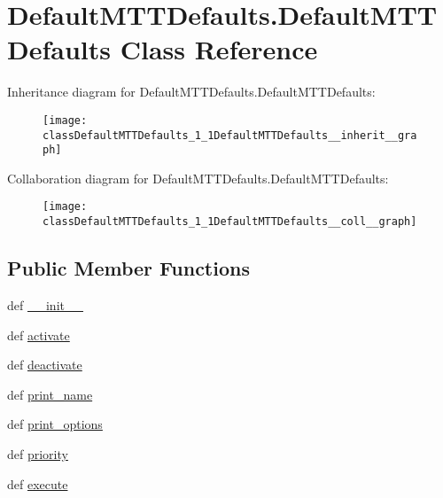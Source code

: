 \hypertarget{classDefaultMTTDefaults_1_1DefaultMTTDefaults}{\section{Default\-M\-T\-T\-Defaults.\-Default\-M\-T\-T\-Defaults Class Reference}
\label{classDefaultMTTDefaults_1_1DefaultMTTDefaults}
}


Inheritance diagram for Default\-M\-T\-T\-Defaults.\-Default\-M\-T\-T\-Defaults\-:\nopagebreak
\begin{figure}[H]
\begin{center}
\leavevmode
\texttt{[image: classDefaultMTTDefaults\_1\_1DefaultMTTDefaults\_\_inherit\_\_graph]}
\end{center}
\end{figure}


Collaboration diagram for Default\-M\-T\-T\-Defaults.\-Default\-M\-T\-T\-Defaults\-:\nopagebreak
\begin{figure}[H]
\begin{center}
\leavevmode
\texttt{[image: classDefaultMTTDefaults\_1\_1DefaultMTTDefaults\_\_coll\_\_graph]}
\end{center}
\end{figure}
\subsection*{Public Member Functions}
\begin{DoxyCompactItemize}
\item 
def \hyperlink{classDefaultMTTDefaults_1_1DefaultMTTDefaults_af45ae89ffdda25b5db56cc32d6f38617}{\-\_\-\-\_\-init\-\_\-\-\_\-}
\item 
def \hyperlink{classDefaultMTTDefaults_1_1DefaultMTTDefaults_ab168e4b76bd07ff868f6d8c8dcfbabcd}{activate}
\item 
def \hyperlink{classDefaultMTTDefaults_1_1DefaultMTTDefaults_abbdeb62905e733e0145243e238991e1b}{deactivate}
\item 
def \hyperlink{classDefaultMTTDefaults_1_1DefaultMTTDefaults_a39fc17ab14b57f8aeaa7df1a6b32f059}{print\-\_\-name}
\item 
def \hyperlink{classDefaultMTTDefaults_1_1DefaultMTTDefaults_aedf1031336bf735bb00dcc8d80a0bd4a}{print\-\_\-options}
\item 
def \hyperlink{classDefaultMTTDefaults_1_1DefaultMTTDefaults_a22c85638c99e8a0dcb01d31c326bfc55}{priority}
\item 
def \hyperlink{classDefaultMTTDefaults_1_1DefaultMTTDefaults_a2ccbda4994ea610724763268ab05181e}{execute}
\end{DoxyCompactItemize}
